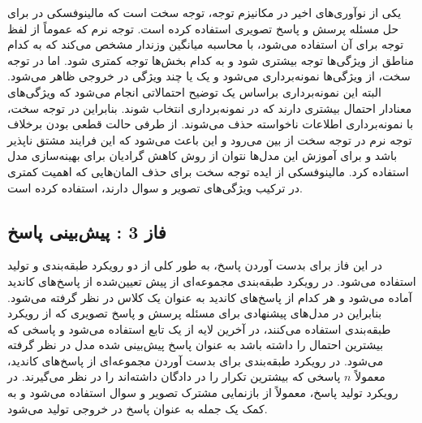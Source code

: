 یکی از نوآوری‌های اخیر در مکانیزم توجه، توجه سخت
است که مالینوفسکی در 
\cite{malinowski2018learning}
 برای حل مسئله پرسش و پاسخ تصویری استفاده کرده است. توجه نرم
که عموماً از لفظ توجه برای آن استفاده می‌شود، با محاسبه میانگین وزندار مشخص می‌کند که به کدام مناطق از ویژگی‌ها توجه بیشتری شود و به کدام بخش‌ها توجه کمتری شود. اما در توجه سخت، از ویژگی‌ها نمونه‌برداری
 ‌می‌شود و یک یا چند ویژگی در خروجی ظاهر می‌شود. البته این نمونه‌برداری براساس یک توضیح احتمالاتی انجام می‌شود که ویژگی‌های معنادار احتمال بیشتری دارند که در نمونه‌برداری انتخاب شوند. بنابراین در توجه سخت، با نمونه‌برداری اطلاعات ناخواسته حذف می‌شوند. از طرفی حالت قطعی بودن برخلاف توجه نرم در توجه سخت از بین می‌رود و این باعث می‌شود که این فرایند مشتق ناپذیر باشد و برای آموزش این مدل‌ها نتوان از روش کاهش گرادیان برای بهینه‌سازی مدل استفاده کرد. مالینوفسکی
\cite{malinowski2018learning}
  از ایده توجه سخت برای حذف المان‌هایی که اهمیت کمتری در ترکیب ویژگی‌های تصویر و سوال دارند، استفاده کرده است.

\subsection{فاز 3 : پیش‌بینی پاسخ}
در این فاز برای بدست آوردن پاسخ، به طور کلی از دو رویکرد طبقه‌بندی
 و تولید
استفاده می‌شود. در رویکرد طبقه‌بندی مجموعه‌ای از پیش تعیین‌شده از پاسخ‌های کاندید آماده می‌شود و هر کدام از پاسخ‌های کاندید به عنوان یک کلاس در نظر گرفته می‌شود. بنابراین در مدل‌های پیشنهادی برای مسئله پرسش و پاسخ تصویری که از رویکرد طبقه‌بندی استفاده می‌کنند، در آخرین لایه از یک تابع
استفاده می‌شود و پاسخی که بیشترین احتمال را داشته باشد به عنوان پاسخ پیش‌بینی شده مدل در نظر گرفته می‌شود. در رویکرد طبقه‌بندی برای بدست آوردن مجموعه‌ای از پاسخ‌های کاندید، معمولاً $n$ پاسخی که بیشترین تکرار را در ‌دادگان داشته‌اند را در نظر می‌گیرند. در رویکرد تولید پاسخ، معمولاً از بازنمایی مشترک تصویر و سوال استفاده می‌شود و به کمک 
یک جمله به عنوان پاسخ در خروجی تولید می‌شود.

